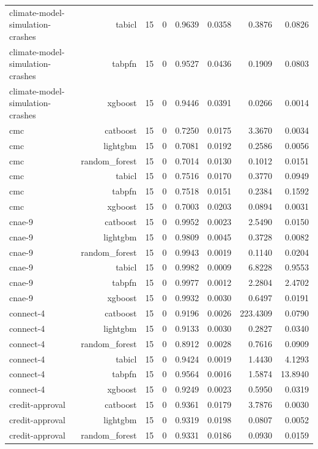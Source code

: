 \begin{table}[htbp]
\begin{tabular}{lrrrrrrr}
climate-model-simulation-crashes & tabicl & 15 & 0 & 0.9639 & 0.0358 & 0.3876 & 0.0826 \\
climate-model-simulation-crashes & tabpfn & 15 & 0 & 0.9527 & 0.0436 & 0.1909 & 0.0803 \\
climate-model-simulation-crashes & xgboost & 15 & 0 & 0.9446 & 0.0391 & 0.0266 & 0.0014 \\
cmc & catboost & 15 & 0 & 0.7250 & 0.0175 & 3.3670 & 0.0034 \\
cmc & lightgbm & 15 & 0 & 0.7081 & 0.0192 & 0.2586 & 0.0056 \\
cmc & random\_forest & 15 & 0 & 0.7014 & 0.0130 & 0.1012 & 0.0151 \\
cmc & tabicl & 15 & 0 & 0.7516 & 0.0170 & 0.3770 & 0.0949 \\
cmc & tabpfn & 15 & 0 & 0.7518 & 0.0151 & 0.2384 & 0.1592 \\
cmc & xgboost & 15 & 0 & 0.7003 & 0.0203 & 0.0894 & 0.0031 \\
cnae-9 & catboost & 15 & 0 & 0.9952 & 0.0023 & 2.5490 & 0.0150 \\
cnae-9 & lightgbm & 15 & 0 & 0.9809 & 0.0045 & 0.3728 & 0.0082 \\
cnae-9 & random\_forest & 15 & 0 & 0.9943 & 0.0019 & 0.1140 & 0.0204 \\
cnae-9 & tabicl & 15 & 0 & 0.9982 & 0.0009 & 6.8228 & 0.9553 \\
cnae-9 & tabpfn & 15 & 0 & 0.9977 & 0.0012 & 2.2804 & 2.4702 \\
cnae-9 & xgboost & 15 & 0 & 0.9932 & 0.0030 & 0.6497 & 0.0191 \\
connect-4 & catboost & 15 & 0 & 0.9196 & 0.0026 & 223.4309 & 0.0790 \\
connect-4 & lightgbm & 15 & 0 & 0.9133 & 0.0030 & 0.2827 & 0.0340 \\
connect-4 & random\_forest & 15 & 0 & 0.8912 & 0.0028 & 0.7616 & 0.0909 \\
connect-4 & tabicl & 15 & 0 & 0.9424 & 0.0019 & 1.4430 & 4.1293 \\
connect-4 & tabpfn & 15 & 0 & 0.9564 & 0.0016 & 1.5874 & 13.8940 \\
connect-4 & xgboost & 15 & 0 & 0.9249 & 0.0023 & 0.5950 & 0.0319 \\
credit-approval & catboost & 15 & 0 & 0.9361 & 0.0179 & 3.7876 & 0.0030 \\
credit-approval & lightgbm & 15 & 0 & 0.9319 & 0.0198 & 0.0807 & 0.0052 \\
credit-approval & random\_forest & 15 & 0 & 0.9331 & 0.0186 & 0.0930 & 0.0159 \\

\end{tabular}
\end{table}
